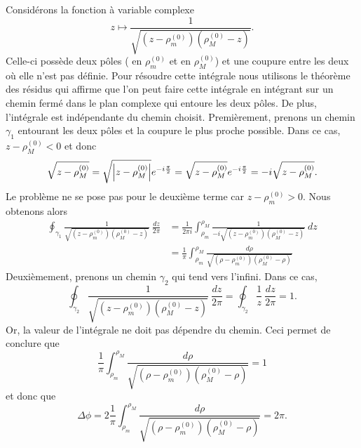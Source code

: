 \documentclass[a4paper,11pt]{report}
\theoremstyle{definition}
\theoremstyle{plain}
\theoremstyle{definition}
\theoremstyle{remark}
\begin{document}
            Considérons la fonction à variable complexe
            \begin{equation*}
                z\mapsto \frac{1}{\sqrt{\left( z-\rho^{(0)}_m \right)\left( \rho^{(0)}_M-z \right)}}.
            \end{equation*}
            Celle-ci possède deux pôles ( en $\rho^{(0)}_m$ et en $\rho^{(0)}_M$) et une coupure entre les deux où elle n'est pas définie. Pour résoudre cette intégrale nous utilisons le théorème des résidus qui affirme que l'on peut faire cette intégrale en intégrant sur un chemin fermé dans le plan complexe qui entoure les deux pôles. De plus, l'intégrale est indépendante du chemin choisit. Premièrement, prenons un chemin $\gamma_1$ entourant les deux pôles et la coupure le plus proche possible. Dans ce cas, $z-\rho^{(0)}_M<0$ et donc
            \begin{equation}
                \sqrt{z-\rho^{(0)}_M} = \sqrt{\abs{z-\rho^{(0)}_M}}e^{-i\frac{\pi}{2}} = \sqrt{z-\rho^{(0)}_M}e^{-i\frac{\pi}{2}} = -i\sqrt{z-\rho^{(0)}_M}.
            \end{equation}
            Le problème ne se pose pas pour le deuxième terme car $z-\rho^{(0)}_m>0$. Nous obtenons alors
            \begin{align}
                \oint_{\gamma_1} \frac{1}{\sqrt{\left( z-\rho^{(0)}_m \right)\left( \rho^{(0)}_M-z \right)}}~\frac{dz}{2\pi} &= \frac{1}{2\pi i} \int^{\rho_M}_{\rho_m}\frac{1}{-i\sqrt{\left( z-\rho^{(0)}_m \right)\left( \rho^{(0)}_M-z \right)}}~dz\\
                &= \frac{1}{\pi} \int^{\rho_M}_{\rho_m}\frac{d\rho}{\sqrt{\left( \rho-\rho^{(0)}_m \right)\left( \rho^{(0)}_M-\rho \right)}}
            \end{align}
            Deuxièmement, prenons un chemin $\gamma_2$ qui tend vers l'infini. Dans ce cas,
            \begin{equation}
                \oint_{\gamma_2} \frac{1}{\sqrt{\left( z-\rho^{(0)}_m \right)\left( \rho^{(0)}_M-z \right)}}~\frac{dz}{2\pi} = \oint_{\gamma_2}\frac{1}{z}~\frac{dz}{2\pi} = 1.
            \end{equation}
            Or, la valeur de l'intégrale ne doit pas dépendre du chemin. Ceci permet de conclure que
            \begin{equation}
                \frac{1}{\pi} \int^{\rho_M}_{\rho_m}\frac{d\rho}{\sqrt{\left( \rho-\rho^{(0)}_m \right)\left( \rho^{(0)}_M-\rho \right)}} = 1
            \end{equation}
            et donc que
            \begin{equation}
                \Delta\phi = 2 \frac{1}{\pi} \int^{\rho_M}_{\rho_m}\frac{d\rho}{\sqrt{\left( \rho-\rho^{(0)}_m \right)\left( \rho^{(0)}_M-\rho \right)}} = 2\pi.
            \end{equation}
        
\end{document}
